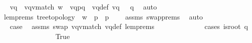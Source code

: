 \begin{isabellebody}
\ \isamarkupfalse%
\ vq\ \ vq{\isacharunderscore}{\kern0pt}v{\isacharunderscore}{\kern0pt}match{\isacharcolon}{\kern0pt}\ {\isachardoublequoteopen}{\isacharparenleft}{\kern0pt}{\isacharparenleft}{\kern0pt}w{\isasymdown}\isactrlsub {\isacharquery}{\kern0pt}{\isacharparenright}{\kern0pt}{\isasymdown}\isactrlsub {\isacharbang}{\kern0pt}\isactrlsub {\isacharquery}{\kern0pt}{\isacharparenright}{\kern0pt}\ {\isacharequal}{\kern0pt}\ {\isacharparenleft}{\kern0pt}{\isacharparenleft}{\kern0pt}{\isacharparenleft}{\kern0pt}vq{\isasymdown}\isactrlsub {\isacharbraceleft}{\kern0pt}\isactrlsub p\isactrlsub {\isacharcomma}{\kern0pt}\isactrlsub q\isactrlsub {\isacharbraceright}{\kern0pt}{\isacharparenright}{\kern0pt}{\isasymdown}\isactrlsub {\isacharbang}{\kern0pt}{\isacharparenright}{\kern0pt}{\isasymdown}\isactrlsub {\isacharbang}{\kern0pt}\isactrlsub {\isacharquery}{\kern0pt}{\isacharparenright}{\kern0pt}{\isachardoublequoteclose}\ \ vq{\isacharunderscore}{\kern0pt}def{\isacharcolon}{\kern0pt}\ {\isachardoublequoteopen}vq\ {\isasymin}\ {\isasymL}\isactrlsup {\isacharasterisk}{\kern0pt}\ q{\isachardoublequoteclose}\ \isamarkupfalse%
\ auto\ \isanewline
\ \ \ \ \ \ \ \ \ \ \ \ \isamarkupfalse%
\ lem{}{\isacharunderscore}{\kern0pt}{}{\isacharunderscore}{\kern0pt}prems{\isacharcolon}{\kern0pt}\ {\isachardoublequoteopen}tree{\isacharunderscore}{\kern0pt}topology\ {\isasymand}\ w\ {\isasymin}\ {\isasymL}\isactrlsup {\isacharasterisk}{\kern0pt}{\isacharparenleft}{\kern0pt}p{\isacharparenright}{\kern0pt}\ {\isasymand}\ p\ {\isasymin}\ {\isasymP}{\isachardoublequoteclose}\ \isamarkupfalse%
\ assms\ swap{\isachardot}{\kern0pt}prems\ \isamarkupfalse%
\ auto\isanewline
\ \ \ \ \ \ \ \ \ \ \ \ \isamarkupfalse%
\ \isamarkupfalse%
\ {\isacharquery}{\kern0pt}case\ \isamarkupfalse%
\ assms\ swap\ vq{\isacharunderscore}{\kern0pt}v{\isacharunderscore}{\kern0pt}match\ vq{\isacharunderscore}{\kern0pt}def\ lem{}{\isacharunderscore}{\kern0pt}{}{\isacharunderscore}{\kern0pt}prems\isanewline
\ \ \ \ \ \ \ \ \ \ \ \ \isamarkupfalse%
\ {\isacharparenleft}{\kern0pt}cases\ {\isachardoublequoteopen}is{\isacharunderscore}{\kern0pt}root\ q{\isachardoublequoteclose}{\isacharparenright}{\kern0pt}\isanewline
\ \ \ \ \ \ \ \ \ \ \ \ \ \ \isamarkupfalse%
\ True\isanewline
\ \ \ \ \ \ \ \ \ \ \ \ \ \ \isamarkupfalse%

\end{isabellebody}
